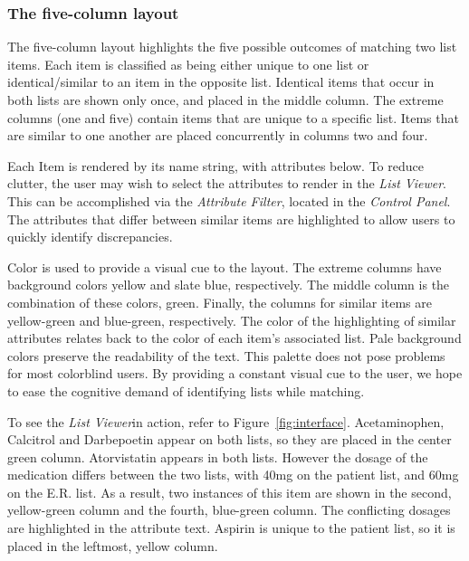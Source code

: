 \documentclass{chi2009}
\newcommand{\ListViewer}{\textit{List Viewer}}
\newcommand{\Controls}{\textit{Control Panel}}
\newcommand{\AttributeFilter}{\textit{Attribute Filter}}
\begin{document}
\subsubsection{The five-column layout}
The five-column layout highlights the five possible outcomes of matching two list items. Each item is classified as being either unique to one list or identical/similar to an item in the opposite list. Identical items that occur in both lists are shown only once, and placed in the middle column. The extreme columns (one and five) contain items that are unique to a specific list. Items that are similar to one another are placed concurrently in columns two and four.

Each Item is rendered by its name string, with attributes below. To reduce clutter, the user may wish to select the attributes to render in the \ListViewer. This can be accomplished via the \AttributeFilter, located in the \Controls. The attributes that differ between similar items are highlighted to allow users to quickly identify discrepancies.

Color is used to provide a visual cue to the layout. The extreme columns have background colors yellow and slate blue, respectively. The middle column is the combination of these colors, green. Finally, the columns for similar items are yellow-green and blue-green, respectively. The color of the highlighting of similar attributes relates back to the color of each item's associated list. Pale background colors preserve the readability of the text. This palette does not pose problems for most colorblind users. By providing a constant visual cue to the user, we hope to ease the cognitive demand of identifying lists while matching.

To see the \ListViewer in action, refer to Figure~\ref{fig:interface}. Acetaminophen, Calcitrol and Darbepoetin appear on both lists, so they are placed in the center green column. Atorvistatin appears in both lists. However the dosage of the medication differs between the two lists, with 40mg on the patient list, and 60mg on the E.R. list. As a result, two instances of this item are shown in the second, yellow-green column and the fourth, blue-green column. The conflicting dosages are highlighted in the attribute text. Aspirin is unique to the patient list, so it is placed in the leftmost, yellow column.
\end{document}
